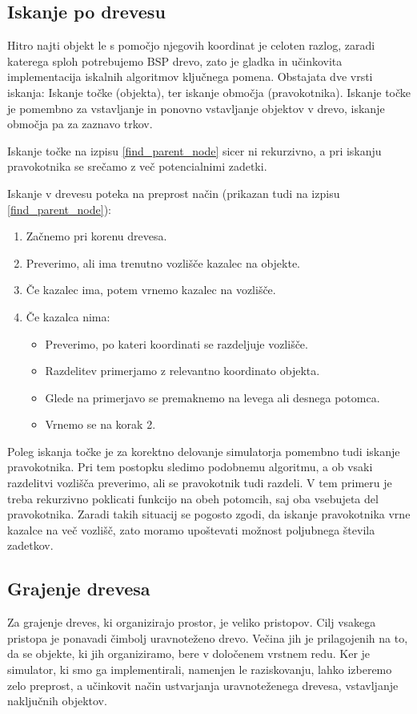 \documentclass[a4paper,12pt]{article}
\begin{document}
\subsection{Iskanje po drevesu}

Hitro najti objekt le s pomočjo njegovih koordinat je celoten razlog, zaradi katerega
sploh potrebujemo BSP drevo, zato je gladka in učinkovita implementacija iskalnih algoritmov
ključnega pomena. Obstajata dve vrsti iskanja:
Iskanje točke (objekta), ter iskanje območja (pravokotnika). Iskanje točke je pomembno za
vstavljanje in ponovno vstavljanje objektov v drevo, iskanje območja pa za zaznavo trkov.


Iskanje točke na izpisu \ref{find_parent_node} sicer ni rekurzivno, a pri
iskanju pravokotnika se srečamo z več potencialnimi zadetki.
\begin{samepage}
Iskanje v drevesu poteka na preprost način (prikazan tudi na izpisu \ref{find_parent_node}):
    \begin{enumerate}
        \item Začnemo pri korenu drevesa.
        \item Preverimo, ali ima trenutno vozlišče kazalec na objekte.
        \item Če kazalec ima, potem vrnemo kazalec na vozlišče.
        \item Če kazalca nima:
        \begin{itemize}
            \item Preverimo, po kateri koordinati se razdeljuje vozlišče.
            \item Razdelitev primerjamo z relevantno koordinato objekta.
            \item Glede na primerjavo se premaknemo na levega ali desnega potomca.
            \item Vrnemo se na korak 2.
        \end{itemize}    
    \end{enumerate}
\end{samepage}

Poleg iskanja točke je za korektno delovanje simulatorja pomembno tudi iskanje pravokotnika. Pri tem postopku
sledimo podobnemu algoritmu, a ob vsaki razdelitvi vozlišča preverimo, ali se pravokotnik tudi razdeli. V tem
primeru je treba rekurzivno poklicati funkcijo na obeh potomcih, saj oba vsebujeta del pravokotnika. Zaradi takih
situacij se pogosto zgodi, da iskanje pravokotnika vrne kazalce na več vozlišč, zato moramo upoštevati možnost
poljubnega števila zadetkov.
\subsection{Grajenje drevesa}
Za grajenje dreves, ki organizirajo prostor, je veliko pristopov. Cilj vsakega pristopa je ponavadi čimbolj
uravnoteženo drevo. Večina jih je prilagojenih na to, da se objekte, ki jih organiziramo, bere v določenem
vrstnem redu. Ker je simulator, ki smo ga implementirali, namenjen le raziskovanju, lahko izberemo zelo 
preprost, a učinkovit način ustvarjanja uravnoteženega drevesa, vstavljanje naključnih objektov.
\end{document}
